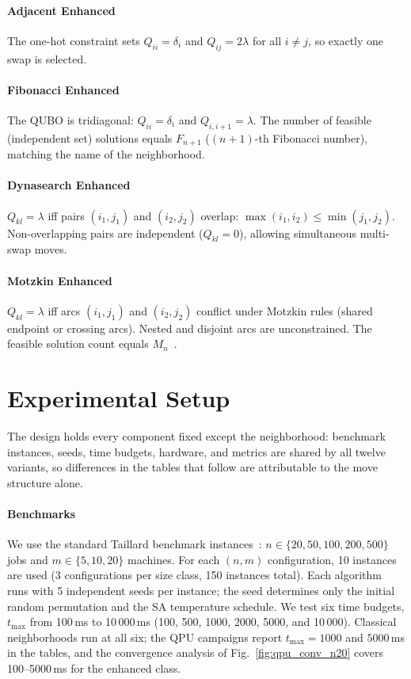 \documentclass[preprint,12pt,authoryear]{elsarticle}
\begin{document}
\paragraph{Adjacent Enhanced}
The one-hot constraint sets $Q_{ii} = \delta_i$ and $Q_{ij} = 2\lambda$
for all $i \neq j$, so exactly one swap is selected.

\paragraph{Fibonacci Enhanced}
The QUBO is tridiagonal: $Q_{ii} = \delta_i$ and
$Q_{i,i+1} = \lambda$.
The number of feasible (independent set) solutions equals $F_{n+1}$
($(n+1)$-th Fibonacci number), matching the name of the neighborhood.

\paragraph{Dynasearch Enhanced}
$Q_{kl} = \lambda$ iff pairs $(i_1,j_1)$ and $(i_2,j_2)$ overlap:
$\max(i_1,i_2) \leq \min(j_1,j_2)$. Non-overlapping pairs are
independent ($Q_{kl} = 0$), allowing simultaneous multi-swap moves.

\paragraph{Motzkin Enhanced}
$Q_{kl} = \lambda$ iff arcs $(i_1,j_1)$ and $(i_2,j_2)$ conflict
under Motzkin rules (shared endpoint or crossing arcs).
Nested and disjoint arcs are unconstrained.
The feasible solution count equals $M_n$~\citep{Motzkin_PWR}.

\section{Experimental Setup}
\label{sec:setup}

The design holds every component fixed except the neighborhood:
benchmark instances, seeds, time budgets, hardware, and metrics are
shared by all twelve variants, so differences in the tables that
follow are attributable to the move structure alone.

\paragraph{Benchmarks}
We use the standard Taillard benchmark
instances~\citep{ref_taillard}: $n \in \{20, 50, 100, 200, 500\}$
jobs and $m \in \{5, 10, 20\}$ machines.
For each $(n, m)$ configuration, 10 instances are used (3 configurations
per size class, 150 instances total).
Each algorithm runs with 5 independent seeds per instance; the seed
determines only the initial random permutation and the SA temperature
schedule.
We test six time budgets, $t_{\max}$ from 100\,ms to 10\,000\,ms
(100, 500, 1000, 2000, 5000, and 10\,000). Classical neighborhoods run at all six; the
QPU campaigns report $t_{\max} = 1000$ and $5000$\,ms in the tables,
and the convergence analysis of Fig.~\ref{fig:qpu_conv_n20} covers
100--5000\,ms for the enhanced class.
\end{document}
